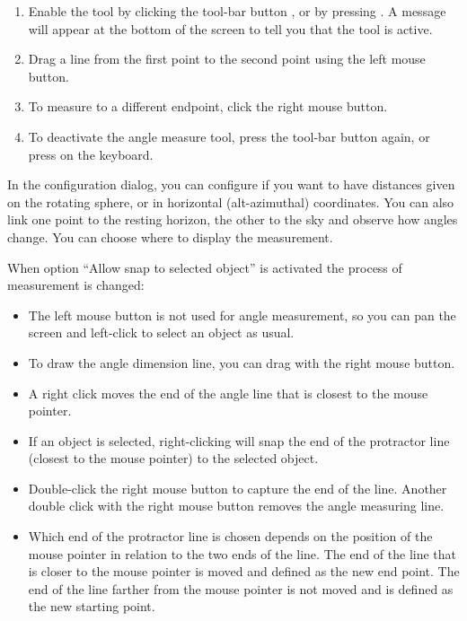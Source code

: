 \begin{enumerate}
\item Enable the tool by clicking the tool-bar button
  , or by pressing
  . A message will appear at the bottom of the screen to
  tell you that the tool is active.
\item Drag a line from the first point to the second point using the
  left mouse button.
\item To measure to a different endpoint, click the right mouse button.
\item To deactivate the angle measure tool, press the tool-bar button
  again, or press  on the keyboard.
\end{enumerate}

\noindent In the configuration dialog, you can configure if you want to have
distances given on the rotating sphere, or in horizontal
(alt-azimuthal) coordinates. You can also link one point to the
resting horizon, the other to the sky and observe how angles change.
You can choose where to display the measurement.

When option %
``Allow snap to selected object'' is activated the process of measurement is changed:
\begin{itemize}
 \item The left mouse button is not used for angle measurement, so you
   can pan the screen and left-click to select an object as usual.
 \item To draw the angle dimension line, you can drag with the right
   mouse button.
 \item A right click moves the end of the angle line that is closest
   to the mouse pointer.
 \item If an object is selected, right-clicking will snap the end of
   the protractor line (closest to the mouse pointer) to the selected
   object.
 \item Double-click the right mouse button to capture the end of the
   line. Another double click with the right mouse button removes the
   angle measuring line.
 \item Which end of the protractor line is chosen depends on the
   position of the mouse pointer in relation to the two ends of the
   line. The end of the line that is closer to the mouse pointer is
   moved and defined as the new end point. The end of the line farther
   from the mouse pointer is not moved and is defined as the new
   starting point.
\end{itemize}

